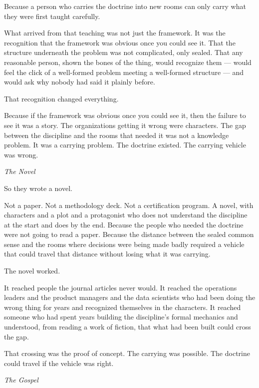 Because a person who carries the doctrine into new rooms can only carry what they were first taught carefully.

What arrived from that teaching was not just the framework. It was the recognition that the framework was obvious once you could see it. That the structure underneath the problem was not complicated, only sealed. That any reasonable person, shown the bones of the thing, would recognize them --- would feel the click of a well-formed problem meeting a well-formed structure --- and would ask why nobody had said it plainly before.

That recognition changed everything.

Because if the framework was obvious once you could see it, then the failure to see it was a story. The organizations getting it wrong were characters. The gap between the discipline and the rooms that needed it was not a knowledge problem. It was a carrying problem. The doctrine existed. The carrying vehicle was wrong.

\vspace{1.5em}
\begin{center}
  \small\itshape The Novel
\end{center}
\vspace{1.5em}

So they wrote a novel.

Not a paper. Not a methodology deck. Not a certification program. A novel, with characters and a plot and a protagonist who does not understand the discipline at the start and does by the end. Because the people who needed the doctrine were not going to read a paper. Because the distance between the sealed common sense and the rooms where decisions were being made badly required a vehicle that could travel that distance without losing what it was carrying.

The novel worked.

It reached people the journal articles never would. It reached the operations leaders and the product managers and the data scientists who had been doing the wrong thing for years and recognized themselves in the characters. It reached someone who had spent years building the discipline's formal mechanics and understood, from reading a work of fiction, that what had been built could cross the gap.

That crossing was the proof of concept. The carrying was possible. The doctrine could travel if the vehicle was right.

\vspace{1.5em}
\begin{center}
  \small\itshape The Gospel
\end{center}
\vspace{1.5em}


